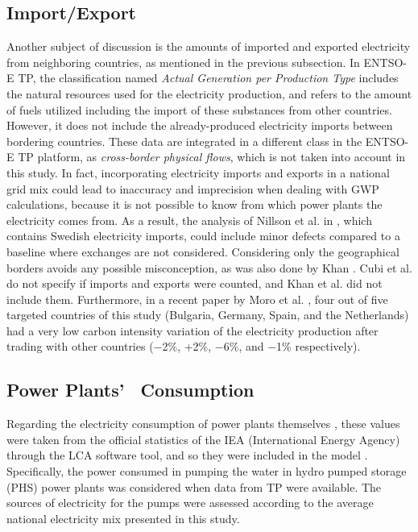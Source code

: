 \subsection*{Import/Export}
Another subject of discussion is the amounts of imported and exported  electricity from neighboring countries, as mentioned in the previous subsection. In ENTSO-E TP, the classification named \textit{Actual Generation per Production Type} includes the natural resources used for the electricity production, and refers to the amount of fuels utilized including the import of these substances from other countries. However, it does not include the already-produced electricity imports between bordering countries. These data are integrated in a different class in the ENTSO-E TP platform, as \textit{cross-border physical flows}, which is not taken into account in this study. In fact, incorporating electricity imports and exports in a national grid mix could lead to inaccuracy and imprecision when dealing with GWP calculations, because it is not possible to know from which power plants the electricity comes from. As a result, the analysis of Nillson et al. in \cite{Nilsson2017AssessingEmissions}, which contains Swedish electricity imports, could include minor defects compared to a baseline where exchanges are not considered. Considering only the geographical borders avoids any possible misconception, as was also done by Khan \cite{Khan2018}. Cubi et al. \cite{Cubi2015IncorporationAssessment} do not specify if imports and exports were counted, and Khan et al. \cite{Khan2018AnalysisIntensity} did not include them. Furthermore, in a recent paper by Moro et al. \cite{Moro2017}, four out of five targeted countries of this study (Bulgaria, Germany, Spain, and the Netherlands) had a very low carbon intensity variation of the electricity production after trading with other countries ($-$2\%, +2\%, $-$6\%, and $-$1\% respectively).



\subsection*{Power Plants{'}%
~Consumption}
Regarding {the electricity consumption of power plants themselves}%
, these values were taken from the official statistics of the IEA (International Energy Agency) through the LCA software tool, and so they were included in the model \cite{PEInternational2014GaBiV6}. Specifically, the power consumed in pumping the water in hydro pumped storage (PHS) power plants was considered when data from TP were available. The sources of electricity for the pumps were assessed according to the average national electricity mix presented in this study.


